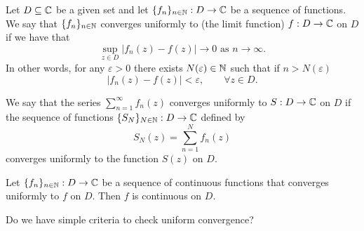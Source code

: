 \documentclass[10pt, a4paper]{article}
\begin{document}
\begin{definition}
    Let $D \subseteq \mathbb{C}$ be a given set and let $\{f_n\}_{n \in \mathbb{N}} : D \to \mathbb{C}$ be a sequence of functions.
    We say that $\{f_n\}_{n \in \mathbb{N}}$ converges uniformly to
    (the limit function)
    $f : D \to \mathbb{C}$ on $D$ if we have that
    \[
    \sup_{z \in D}|f_n(z) - f(z)| \to 0\text{ as } n \to \infty.
    \]
    In other words,
    for any $\varepsilon > 0$ there exists $N(\varepsilon) \in \mathbb{N}$ such that if $n > N(\varepsilon)$
    \[
    |f_n(z) - f(z)| < \varepsilon,\qquad \forall z \in D.
    \]

    We say that the series $\sum_{n = 1}^{\infty}f_n(z)$ converges uniformly to $S : D \to \mathbb{C}$ on $D$ if the sequence of functions $\{S_N\}_{N \in \mathbb{N}} : D \to \mathbb{C}$ defined by
    \[
    S_N(z) = \sum_{n = 1}^{N}f_n(z)
    \]
    converges uniformly to the function $S(z)$ on $D$.
\end{definition}

\begin{theorem}
    Let $\{f_n\}_{n \in \mathbb{N}} : D \to \mathbb{C}$  be a sequence of continuous functions that converges uniformly to $f$ on $D$.
    Then $f$ is continuous on $D$.
\end{theorem}

Do we have simple criteria to check uniform convergence?
\end{document}
